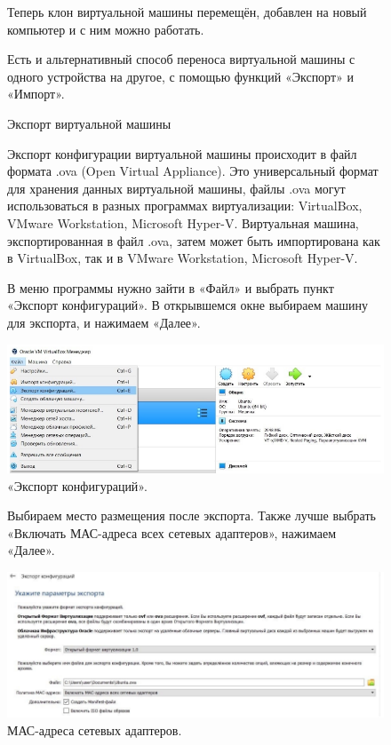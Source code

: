 \documentclass[oneside,final,12pt]{extarticle} %
\begin{document}
\begin{figure}
\quad Теперь клон виртуальной машины перемещён, добавлен на новый компьютер и с ним можно работать.
\end{figure}

\begin{figure}
\quad Есть и альтернативный способ переноса виртуальной машины с одного устройства на другое, с помощью функций «Экспорт» и «Импорт».
\end{figure}

\begin{figure}
\centering
Экспорт виртуальной машины
\label{ris:image}
\end{figure}

\begin{figure}
\quad Экспорт конфигурации виртуальной машины происходит в файл формата .ova (Open Virtual Appliance). Это универсальный формат для хранения данных виртуальной машины, файлы .ova могут использоваться в разных программах виртуализации: VirtualBox, VMware Workstation, Microsoft Hyper-V. Виртуальная машина, экспортированная в файл .ova, затем может быть импортирована как в VirtualBox, так и в VMware Workstation, Microsoft Hyper-V.
\end{figure}

\begin{figure}
\quad В меню программы нужно зайти в «Файл» и выбрать пункт «Экспорт конфигураций». В открывшемся окне выбираем машину для экспорта, и нажимаем «Далее».

		\centering
		\includegraphics[width=0.65\linewidth]{img/12.png}
\caption{«Экспорт конфигураций».}
\label{ris:image}

\end{figure}

\begin{figure}
\quad Выбираем место размещения после экспорта. Также лучше выбрать «Включать МАС-адреса всех сетевых адаптеров», нажимаем «Далее». 

		\centering
		\includegraphics[width=0.65\linewidth]{img/13.png}
\caption{МАС-адреса сетевых адаптеров.}
\label{ris:image}

\end{figure}
\end{document}

